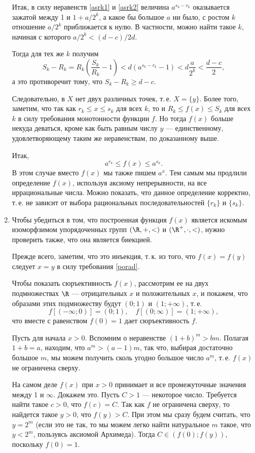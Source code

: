 \begin{enumerate}
Итак, в силу неравенств  \eqref{asrk1} и \eqref{asrk2} величина $a^{s_k-r_k}$ оказывается зажатой между 1 и $1+a/2^k$, а какое бы большое $a$ ни было, с ростом $k$ отношение $a/2^k$ приближается к нулю. В частности, можно найти такое $k$, начиная с которого $a/2^k<(d-c)/2d$.

Тогда для тех же $k$ получим
$$
S_k-R_k = R_k\left(\frac{S_k}{R_k}-1\right)<d(a^{s_k-r_k}-1)<d\frac{a}{2^k}<\frac{d-c}2,
$$
а это противоречит тому, что $S_k-R_k\ge d-c$.

Следовательно, в $X$ нет двух различных точек, т.\,е. $X=\{y\}$. Более того, заметим, что так как $r_k\le x\le s_k$ для всех $k$, то и $R_k\le f(x)\le S_k$ для всех $k$ в силу требования монотонности функции $f$. Но тогда $f(x)$ больше некуда деваться, кроме как быть равным числу $y$ --- единственному, удовлетворяющему таким же неравенствам, по доказанному выше.

Итак,
$$
a^{r_k}\le f(x)\le a^{s_k}.
$$
В этом случае вместо $f(x)$ мы также пишем $a^x$. Тем самым мы продлили определение $f(x)$, используя аксиому непрерывности, на все иррациональные числа. Можно показать, что данное определение корректно, т.\,е. не зависит от выбора рациональных последовательностей $\{r_k\}$ и $\{s_k\}$.

\item Чтобы убедиться в том, что построенная функция $f(x)$ является искомым изоморфзимом упорядоченных групп $(\R,+,<)$ и $(\R^+,\cdot,<)$, нужно проверить также, что она является биекцией.

Прежде всего, заметим, что это инъекция, т.\,к. из того, что $f(x)=f(y)$ следует $x=y$ в силу требования \eqref{porad}.

Чтобы показать сюръективность $f(x)$, рассмотрим ее на двух подмножествах $\R$ --- отрицательных $x$ и положительных $x$, и покажем, что образами этих подмножеству будут $(0;1)$ и $(1;+\infty)$, т.\,е.
$$
f[(-\infty;0)]=(0;1),\quad f[(0;\infty)]=(1;+\infty),
$$
что вместе с равенством $f(0)=1$ дает сюръективность $f$.

Пусть для начала $x>0$. Вспомним о неравенстве $(1+b)^m>bm$. Полагая $1+b=a$, находим, что $a^m>(a-1)m$, так что, выбирая достаточно большое $m$, мы можем получить сколь угодно большое число $a^m$, т.\,е. $f(x)$ не ограничена сверху.

На самом деле $f(x)$ при $x>0$ принимает и все промежуточные значения между 1 и $\infty$. Докажем это.
Пусть $C>1$ --- некоторое число. Требуется найти такое $c>0$, что $f(c)=C$. Так как $f$ не ограничена сверху, то найдется такое $y>0$, что $f(y)>C$. При этом мы сразу будем считать, что $y=2^m$ (если это не так, то мы можем легко найти натуральное $m$ такое, что $y<2^m$, пользуясь аксиомой Архимеда). Тогда $C\in(f(0);f(y))$, поскольку $f(0)=1$.


\end{enumerate}
